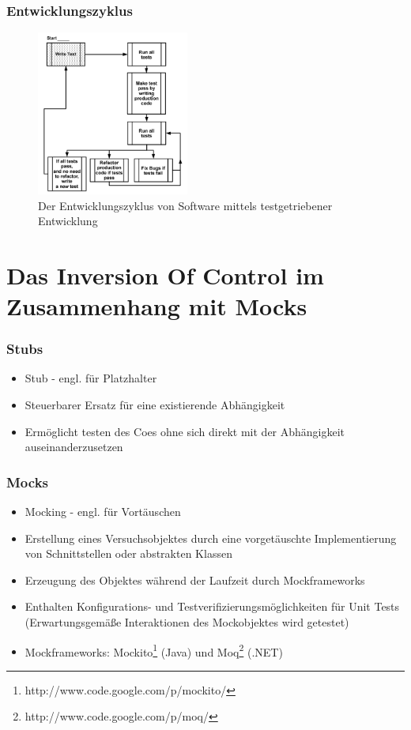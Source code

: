 \documentclass{beamer}
\begin{document}
\begin{frame}
\frametitle{Entwicklungszyklus}
\begin{figure}[htbp]
\includegraphics[width=5cm]{zyklus.png}
\caption{Der Entwicklungszyklus von Software mittels testgetriebener Entwicklung}
\end{figure}
\end{frame}

\section{Das Inversion Of Control im Zusammenhang mit Mocks}
\begin{frame}
\frametitle{Stubs}
\begin{itemize}
\item Stub - engl. für Platzhalter
\item Steuerbarer Ersatz für eine existierende Abhängigkeit
\item Ermöglicht testen des Coes ohne sich direkt mit der Abhängigkeit auseinanderzusetzen
\end{itemize}
\end{frame}


\begin{frame}
\frametitle{Mocks}
\begin{itemize}
\item Mocking - engl. für Vortäuschen
\item Erstellung eines Versuchsobjektes durch eine vorgetäuschte Implementierung von Schnittstellen oder abstrakten Klassen
\item Erzeugung des Objektes während der Laufzeit durch Mockframeworks
\item Enthalten Konfigurations- und Testverifizierungsmöglichkeiten für Unit Tests (Erwartungsgemäße Interaktionen des Mockobjektes wird getestet)
\item Mockframeworks: Mockito\footnote{http://www.code.google.com/p/mockito/} (Java) und Moq\footnote{http://www.code.google.com/p/moq/} (.NET)
\end{itemize}
\end{frame}
\end{document}
